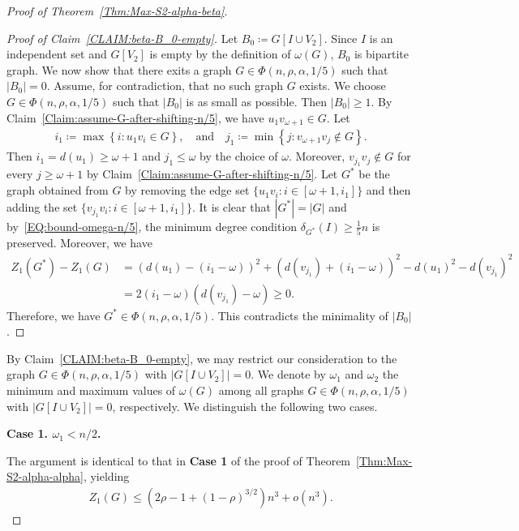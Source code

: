 \documentclass[11pt,a4paper]{article}
\begin{document}
\begin{proof}[Proof of Theorem~\ref{Thm:Max-S2-alpha-beta}]
\begin{proof}[Proof of Claim~\ref{CLAIM:beta-B_0-empty}]
Let $B_0 \coloneqq  G[I\cup V_2]$. 
Since $I$ is an independent set and $G[V_2]$ is empty by the definition of $\omega(G)$, $B_0$ is bipartite graph. 
We now show that there exits a graph $G \in \Phi(n, \rho, \alpha, 1/5)$ such that $|B_0| = 0$. 
Assume, for contradiction, that no such graph $G$ exists. 
We choose $G\in \Phi(n, \rho, \alpha, 1/5)$ such that $|B_0|$ is as small as possible. Then $|B_0|\ge 1$. 
By Claim~\ref{Claim:assume-G-after-shifting-n/5}, we have $u_1v_{\omega+1}\in G$. 
Let 
\begin{align*}
i_1 \coloneqq \max \left\{i \colon u_1v_i \in G\right\}, 
\quad \text{and} \quad
j_1\coloneqq \min\left\{j \colon v_{\omega +1}v_{j} \not\in G \right\}. 
\end{align*} 
Then $i_1 = d(u_1) \ge \omega + 1$ and $j_1 \le \omega$ by the choice of $\omega$. 
Moreover, $v_{j_1}v_j \not\in G$ for every $j \ge \omega+1$ by Claim~\ref{Claim:assume-G-after-shifting-n/5}. 
Let $G^{\ast}$ be the graph obtained from $G$ by removing the edge set $\{u_1 v_i \colon i \in [\omega+1,i_1]\}$ and then adding the set $\{v_{j_1} v_i \colon i \in [\omega+1,i_1]\}$. 
It is clear that $|G^{\ast}| = |G|$ and by~\eqref{EQ:bound-omega-n/5}, the minimum degree condition $\delta_{G^{\ast}}(I) \ge \tfrac{1}{5}n$ is preserved. 
Moreover, we have 
\begin{align*}
Z_{1}(G^{\ast}) - Z_{1}(G)
& = \left(d(u_1)-(i_1-\omega)\right)^2 + \left(d(v_{j_1})+(i_1-\omega)\right)^2 - d(u_1)^2 - d(v_{j_1})^2 \\
& = 2(i_1 - \omega)(d(v_{j_1}) - \omega) 
\ge 0. 
\end{align*}
Therefore, we have $G^{\ast} \in \Phi(n, \rho, \alpha, 1/5)$. 
This contradicts the minimality of $|B_0|$. 
\end{proof}%

By Claim~\ref{CLAIM:beta-B_0-empty}, we may restrict our consideration to the graph $G \in \Phi(n, \rho, \alpha, 1/5)$ with $\left|G[I \cup V_2]\right| = 0$. 
We denote by $\omega_1$ and $\omega_2$ the minimum and maximum values of $\omega(G)$ among all graphs $G \in \Phi(n, \rho, \alpha, 1/5)$ with $\left|G[I\cup V_2]\right| = 0$, respectively. 
We distinguish the following two cases. 

\textbf{Case 1. $\omega_1 < n/2$. }

The argument is identical to that in \textbf{Case 1} of the proof of Theorem~\ref{Thm:Max-S2-alpha-alpha}, yielding 
\begin{align*}
Z_{1}(G) \le \left(2\rho -1 +(1-\rho)^{3/2}\right)n^3 + o(n^3). 
\end{align*}


\end{proof}
\end{document}
